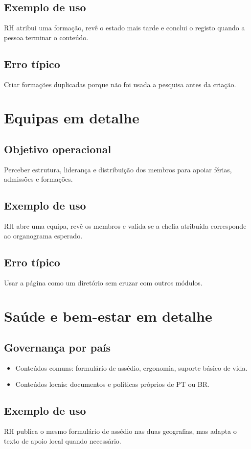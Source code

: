 \subsection{Exemplo de uso}
RH atribui uma formação, revê o estado mais tarde e conclui o registo quando a pessoa terminar o conteúdo.

\subsection{Erro típico}
Criar formações duplicadas porque não foi usada a pesquisa antes da criação.

\section{Equipas em detalhe}
\subsection{Objetivo operacional}
Perceber estrutura, liderança e distribuição dos membros para apoiar férias, admissões e formações.

\subsection{Exemplo de uso}
RH abre uma equipa, revê os membros e valida se a chefia atribuída corresponde ao organograma esperado.

\subsection{Erro típico}
Usar a página como um diretório sem cruzar com outros módulos.

\section{Saúde e bem-estar em detalhe}
\subsection{Governança por país}
\begin{itemize}
  \item Conteúdos comuns: formulário de assédio, ergonomia, suporte básico de vida.
  \item Conteúdos locais: documentos e políticas próprios de PT ou BR.
\end{itemize}

\subsection{Exemplo de uso}
RH publica o mesmo formulário de assédio nas duas geografias, mas adapta o texto de apoio local quando necessário.

